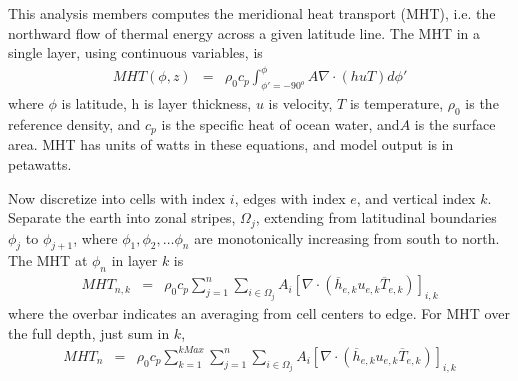 This analysis members computes the meridional heat transport (MHT), i.e. the northward flow of thermal energy across a given latitude line.  The MHT in a single layer, using continuous variables, is
\begin{eqnarray}
MHT(\phi,z) &=& \rho_0 c_p \int_{\phi'=-90^o}^{\phi}  A \nabla \cdot (h u T) d \phi'
\end{eqnarray}
where $\phi$ is latitude, h is layer thickness, $u$ is velocity, $T$ is temperature, $ \rho_0$ is the reference density, and $c_p$ is the specific heat of ocean water, and$A$ is the surface area.  MHT has units of watts in these equations, and model output is in petawatts.

Now discretize into cells with index $i$, edges with index $e$, and vertical index $k$.  Separate the earth into zonal stripes, $\Omega_j$, extending from latitudinal boundaries $\phi_j$ to $\phi_{j+1}$, where $\phi_1, \phi_2, \ldots \phi_n$ are monotonically increasing from south to north.  The MHT at $\phi_n$ in layer $k$ is
\begin{eqnarray}
MHT_{n,k} &=& \rho_0 c_p 
\sum_{j=1}^{n}
{\sum_{i \in \Omega_j} A_i \left[\nabla \cdot ({\overline h}_{e,k} u_{e,k} {\overline T}_{e,k}) \right]_{i,k} }
\end{eqnarray}
where the overbar indicates an averaging from cell centers to edge.  For MHT over the full depth, just sum in $k$,
\begin{eqnarray}
MHT_{n} &=& \rho_0 c_p 
\sum_{k=1}^{kMax}
\sum_{j=1}^{n}
{\sum_{i \in \Omega_j} A_i \left[\nabla \cdot ({\overline h}_{e,k} u_{e,k} {\overline T}_{e,k}) \right]_{i,k} }
\end{eqnarray}



